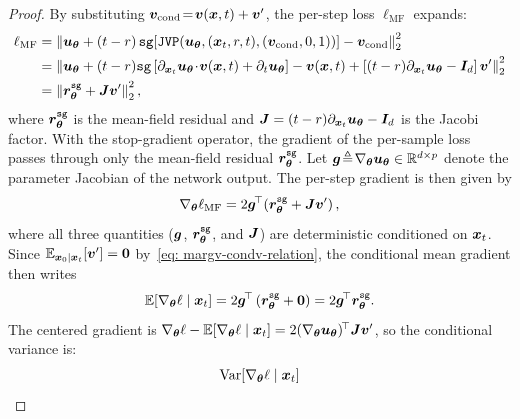 \begin{appendices}
    \begin{proof}
        By substituting ${\bm{v}}_{\text{cond}}\!=\!{\bm{v}}({\bm{x}},t)+{\bm{v}}^{\prime}$, the per-step loss $\ell_{\text{MF}}$ expands:
        \begin{equation}
            \begin{aligned}
            \ell_{\text{MF}} &=\left\|{\bm{u}}_{{\bm{\theta}}}+(t-r)\,\texttt{sg}\!\left[\texttt{JVP}({\bm{u}}_{{\bm{\theta}}},({\bm{x}}_{t},r,t),({\bm{v}}_{\text{cond}},0,1))\right]-{\bm{v}}_{\text{cond}}\right\|_{2}^{2} \\
            &= \left\|{\bm{u}}_{{\bm{\theta}}}+(t-r)\texttt{sg}\left[\partial_{{\bm{x}}_{t}}{\bm{u}}_{{\bm{\theta}}}\!\cdot\!{\bm{v}}({\bm{x}},t)+\partial_{t}{\bm{u}}_{{\bm{\theta}}}\right]-{\bm{v}}({\bm{x}},t)+\left[(t-r)\partial_{{\bm{x}}_{t}}{\bm{u}}_{{\bm{\theta}}}-{\bm{I}}_{d}\right]{\bm{v}}^{\prime}\right\|_{2}^{2} \\
            &= \left\|{\bm{r}}^{\texttt{sg}}_{{\bm{\theta}}}+{\bm{J}}{\bm{v}}^{\prime}\right\|_{2}^{2},
            \end{aligned}
        \end{equation}
        where ${\bm{r}}_{{\bm{\theta}}}^{\texttt{sg}}$ is the mean-field residual and ${\bm{J}}=(t-r)\partial_{{\bm{x}}_{t}}{\bm{u}}_{{\bm{\theta}}}-{\bm{I}}_{d}$ is the Jacobi factor. With the stop-gradient operator, the gradient of the per-sample loss passes through only the mean-field residual ${\bm{r}}_{{\bm{\theta}}}^{\texttt{sg}}$. Let ${\bm{g}}\!\triangleq\!\nabla_{{\bm{\theta}}}{\bm{u}}_{{\bm{\theta}}}\in\mathbb{R}^{d\times p}$ denote the parameter Jacobian of the network output. The per-step gradient is then given by
        \begin{equation}
            \nabla_{{\bm{\theta}}}\ell_{\text{MF}}=2{\bm{g}}^{\!\top}\!\left({\bm{r}}_{{\bm{\theta}}}^{\texttt{sg}}+{\bm{J}}{\bm{v}}^{\prime}\right),
            \label{eq: per-step-grad}
        \end{equation}
        where all three quantities (${\bm{g}}$, ${\bm{r}}_{{\bm{\theta}}}^{\texttt{sg}}$, and ${\bm{J}}$) are deterministic conditioned on ${\bm{x}}_{t}$. Since $\mathbb{E}_{{\bm{x}}_{0}\mid{\bm{x}}_{t}}[{\bm{v}}^{\prime}]=\bm{0}$ by~\eqref{eq: margv-condv-relation}, the conditional mean gradient then writes
        \begin{equation}
            \mathbb{E}\!\left[\nabla_{{\bm{\theta}}}\ell\mid{\bm{x}}_{t}\right]=2{\bm{g}}^{\!\top}\left({\bm{r}}_{{\bm{\theta}}}^{\texttt{sg}}+\bm{0}\right)=2{\bm{g}}^{\!\top}{\bm{r}}^{\texttt{sg}}_{{\bm{\theta}}}.
        \end{equation}
        The centered gradient is $\nabla_{{\bm{\theta}}}\ell-\mathbb{E}[\nabla_{{\bm{\theta}}}\ell\mid{\bm{x}}_{t}]=2(\nabla_{{\bm{\theta}}}{\bm{u}}_{{\bm{\theta}}})^{\!\top}{\bm{J}}{\bm{v}}^{\prime}$, so the conditional variance is:
        \begin{align}
            \Var\!\left[\nabla_{\vtheta}\ell\mid\vx_{t}\right]

\end{align}
\end{proof}
\end{appendices}

